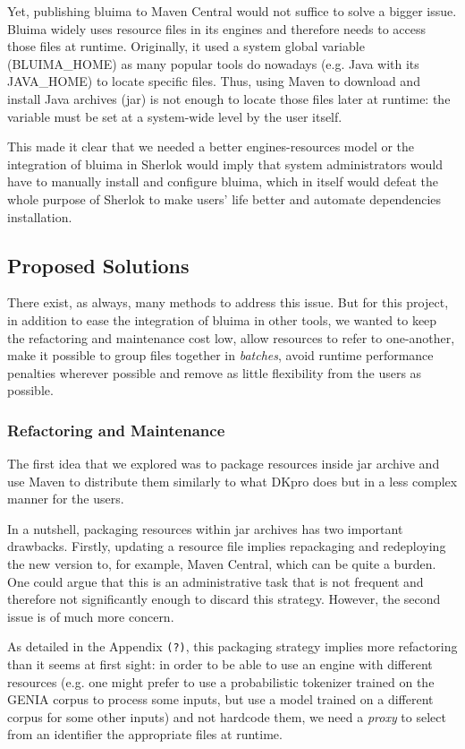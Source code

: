 \documentclass{article}
\newcommand{\ID}[1]{{\textsc{#1}}}
\newcommand{\TODO}[1]{\texttt{\textcolor{YellowOrange}{(#1)}}} %
\begin{document}
Yet, publishing bluima to Maven Central would not suffice to solve a bigger issue. Bluima widely
uses resource files in its engines and therefore needs to access those files at runtime. Originally,
it used a system global variable (\ID{BLUIMA\_HOME}) as many popular tools do nowadays (e.g. Java
with its \ID{JAVA\_HOME}) to locate specific files. Thus, using Maven to download and install Java
archives (jar) is not enough to locate those files later at runtime: the variable must be set at a
system-wide level by the user itself.

This made it clear that we needed a better engines-resources model or the integration of bluima in
Sherlok would imply that system administrators would have to manually install and configure bluima,
which in itself would defeat the whole purpose of Sherlok to make users' life better and automate
dependencies installation.

\subsection{Proposed Solutions}

There exist, as always, many methods to address this issue. But for this project, in addition to
ease the integration of bluima in other tools, we wanted to keep the refactoring and maintenance
cost low, allow resources to refer to one-another, make it possible to group files together in
\emph{batches}, avoid runtime performance penalties wherever possible and remove as little
flexibility from the users as possible.

\subsubsection{Refactoring and Maintenance}

The first idea that we explored was to package resources inside jar archive and use Maven to
distribute them similarly to what DKpro \cite{dkpro} does but in a less complex manner for the
users.

In a nutshell, packaging resources within jar archives has two important drawbacks. Firstly,
updating a resource file implies repackaging and redeploying the new version to, for example, Maven
Central, which can be quite a burden. One could argue that this is an administrative task that is
not frequent and therefore not significantly enough to discard this strategy. However, the second
issue is of much more concern.

As detailed in the Appendix \TODO{?}, this packaging strategy implies more refactoring than it seems
at first sight: in order to be able to use an engine with different resources (e.g. one might prefer
to use a probabilistic tokenizer trained on the GENIA corpus to process some inputs, but use a model
trained on a different corpus for some other inputs) and not hardcode them, we need a \emph{proxy}
to select from an identifier the appropriate files at runtime.
\end{document}
